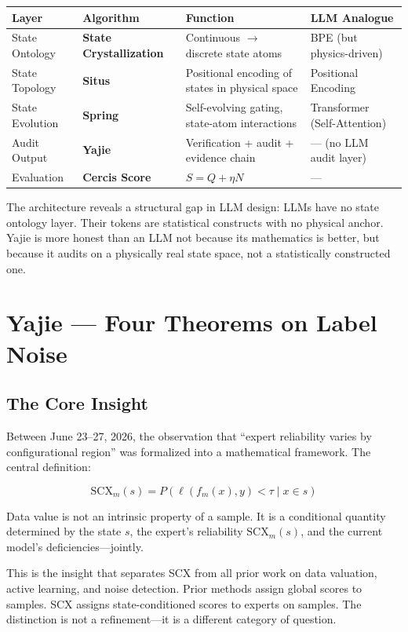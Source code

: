 \documentclass[12pt,a4paper]{ctexart}
\begin{document}
\begin{table}[htbp]
\centering
\begin{tabular}{@{}llll@{}}
\toprule
Layer & Algorithm & Function & LLM Analogue \\
\midrule
State Ontology & \textbf{State Crystallization} & Continuous $\to$ discrete state atoms & BPE (but physics-driven) \\
State Topology & \textbf{Situs} & Positional encoding of states in physical space & Positional Encoding \\
State Evolution & \textbf{Spring} & Self-evolving gating, state-atom interactions & Transformer (Self-Attention) \\
Audit Output & \textbf{Yajie} & Verification + audit + evidence chain & — (no LLM audit layer) \\
Evaluation & \textbf{Cercis Score} & $S = Q + \eta N$ & — \\
\bottomrule
\end{tabular}
\end{table}

The architecture reveals a structural gap in LLM design: LLMs have no state ontology layer. Their tokens are statistical constructs with no physical anchor. Yajie is more honest than an LLM not because its mathematics is better, but because it audits on a physically real state space, not a statistically constructed one.

\section{Yajie — Four Theorems on Label Noise}

\subsection{The Core Insight}

Between June 23–27, 2026, the observation that ``expert reliability varies by configurational region'' was formalized into a mathematical framework. The central definition:

\[
\text{SCX}_m(s) = P(\ell(f_m(x), y) < \tau \mid x \in s)
\]

Data value is not an intrinsic property of a sample. It is a conditional quantity determined by the state $s$, the expert's reliability $\text{SCX}_m(s)$, and the current model's deficiencies—jointly.

This is the insight that separates SCX from all prior work on data valuation, active learning, and noise detection. Prior methods assign global scores to samples. SCX assigns state-conditioned scores to experts on samples. The distinction is not a refinement—it is a different category of question.
\end{document}
